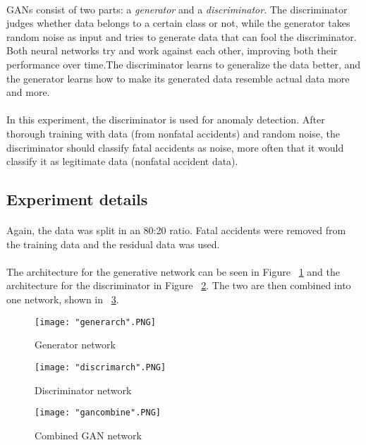 \documentclass[a4paper, 12pt]{article}
\begin{document}
\paragraph{} GANs consist of two parts: a \textit{generator} and a \textit{discriminator}. The discriminator judges whether data belongs to a certain class or not, while the generator takes random noise as input and tries to generate data that can fool the discriminator. Both neural networks try and work against each other, improving both their performance over time.The discriminator learns to generalize the data better, and the generator learns how to make its generated data resemble actual data more and more.
\paragraph{} In this experiment, the discriminator is used for anomaly detection. After thorough training with data (from nonfatal accidents) and random noise, the discriminator should classify fatal accidents as noise, more often that it would classify it as legitimate data (nonfatal accident data).
\subsection{Experiment details}
\paragraph{} Again, the data was split in an 80:20 ratio. Fatal accidents were removed from the training data and the residual data was used.
\paragraph{} The architecture for the generative network can be seen in Figure ~\ref{fig:generator} and the architecture for the discriminator in Figure ~\ref{fig:discriminator}. The two are then combined into one network, shown in ~\ref{fig:gan}.
\begin{figure}[h]
\centering
\texttt{[image: "generarch".PNG]} 
\caption{Generator network}
\label{fig:generator}
\end{figure}

\begin{figure}[h]
\centering
\texttt{[image: "discrimarch".PNG]}
\caption{Discriminator network}
\label{fig:discriminator}
\end{figure}

\begin{figure}[h]
\centering
\texttt{[image: "gancombine".PNG]}
\caption{Combined GAN network}
\label{fig:gan}
\end{figure}
\end{document}
